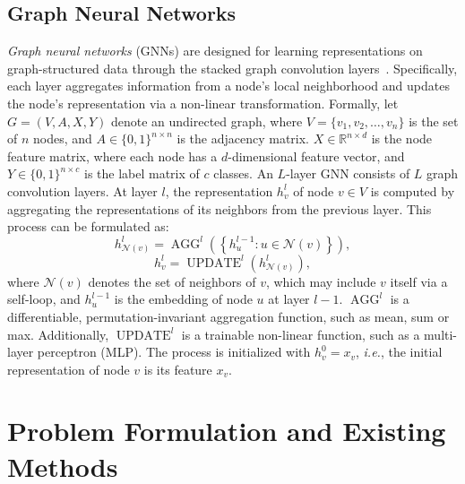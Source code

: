 \documentclass[conference,compsoc]{IEEEtran}
\newcommand{\ie}{\textit{i.e.}\xspace}
\theoremstyle{boldplain}
\theoremstyle{bolddefinition}
\theoremstyle{remark}
\begin{document}
\subsection{Graph Neural Networks}
\label{subsec:prelim_gnn}

\textit{Graph neural networks} (GNNs) are designed for learning representations on graph-structured data through the stacked graph convolution layers~\cite{gilmer2017mpnn,kipf2017gcn,hamilton2017graphsage,velickovic2018gat,xu2019gin}. 
Specifically, each layer aggregates information from a node's local neighborhood and updates the node's representation via a non-linear transformation. 
Formally, let $G=(V,A,X,Y)$ denote an undirected graph, 
where $V = \{v_1, v_2, \ldots, v_n\}$ is the set of $n$ nodes, and $A \in \{0,1\}^{n \times n}$ is the adjacency matrix.
$X \in \mathbb{R}^{n \times d}$ is the node feature matrix, where each node has a $d$-dimensional feature vector, and $Y \in \{0,1\}^{n \times c}$ is the label matrix of $c$ classes. 
An $L$-layer GNN consists of $L$ graph convolution layers. 
At layer $l$, the representation $h_v^l$ of node $v \in V$ is computed by aggregating the representations of its neighbors from the previous layer. 
This 
process can be formulated as:
\begin{equation}
    h_{\mathcal{N}(v)}^{l} = \operatorname{AGG}^{l} \left( \left\{ h_u^{l-1} : u \in \mathcal{N}(v) \right\} \right),
    \label{eq:gnn_aggregate}
\end{equation}
\begin{equation}
    h_v^{l} = \operatorname{UPDATE}^{l} \left( h_{\mathcal{N}(v)}^{l} \right),
    \label{eq:gnn_update}
\end{equation}
where $\mathcal{N}(v)$ denotes the set of neighbors of $v$, which may include $v$ itself via a self-loop, and $h_u^{l-1}$ is the embedding of node $u$ at layer $l-1$. 
$\operatorname{AGG}^{l}$ is a differentiable, permutation-invariant aggregation function, such as mean, sum or max.
Additionally, $\operatorname{UPDATE}^{l}$ is a trainable non-linear function, such as a multi-layer perceptron (MLP). The process is initialized with $h_v^{0} = x_v$, \ie, the initial representation of node $v$ is its feature $x_v$.












\section{Problem Formulation and Existing Methods}
\label{sec:problem_formulation}
\end{document}
